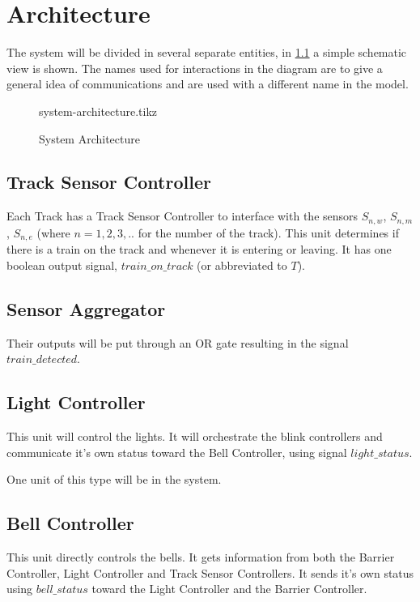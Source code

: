 \documentclass[final]{report}
\begin{document}
\chapter{Architecture}
\label{ch:architecture}
The system will be divided in several separate entities, in \cref{fig:system-architecture} a simple schematic view is shown. The names used for interactions in the diagram are to give a general idea of communications and are used with a different name in the model.

\begin{figure}[H]
	\centering
	{system-architecture.tikz}
	\caption{System Architecture}
	\label{fig:system-architecture}
\end{figure}

\section{Track Sensor Controller}\label{sec:architecture-sensor-controller}
Each Track has a Track Sensor Controller to interface with the sensors $S_{n,w}$, $S_{n,m}$, $S_{n,e}$ (where $n = 1,2,3,..$ for the number of the track).
This unit determines if there is a train on the track and whenever it is entering or leaving.
It has one boolean output signal, $train\_on\_track$ (or abbreviated to $T$).


\section{Sensor Aggregator}\label{sec:architecture-sensor-aggregator}
Their outputs will be put through an OR gate resulting in the signal $train\_detected$.

\section{Light Controller}\label{sec:architecture-light-controller}
This unit will control the lights.
It will orchestrate the blink controllers and communicate it's own status toward the Bell Controller, using signal $light\_status$.

One unit of this type will be in the system.

\section{Bell Controller}\label{sec:architecture-bell-controller}
This unit directly controls the bells.
It gets information from both the Barrier Controller, Light Controller and Track Sensor Controllers.
It sends it's own status using $bell\_status$ toward the Light Controller and the Barrier Controller.
\end{document}
